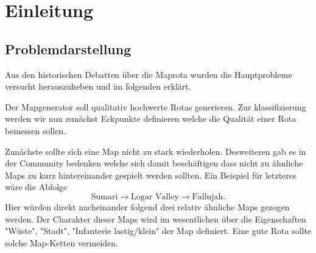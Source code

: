 \section{Einleitung}

        \subsection{Problemdarstellung}
            Aus den historischen Debatten über die Maprota wurden die Hauptprobleme versucht herauszuheben und im folgenden erklärt.

            Der Mapgenerator soll qualitativ hochwerte Rotas generieren.
            Zur klassifizierung werden wir nun zunächst Eckpunkte definieren welche die Qualität einer Rota bemessen sollen.

            Zunächste sollte sich eine Map nicht zu stark wiederholen.
            Desweiteren gab es in der Community bedenken welche sich damit beschäftigen dass nicht zu ähnliche Maps zu kurz hintereinander gespielt werden sollten. 
            Ein Beispiel für letzteres wäre die Abfolge 
            \begin{equation*}
                \text{Sumari} \rightarrow \text{Logar Valley} \rightarrow \text{Fallujah}.
            \end{equation*}
            Hier würden direkt nacheinander folgend drei relativ ähnliche Maps gezogen werden. 
            Der Charakter dieser Maps wird im wesentlichen über die Eigenschaften "Wüste", "Stadt", "Infanterie lastig/klein" der Map definiert.
            Eine gute Rota sollte solche Map-Ketten vermeiden.

